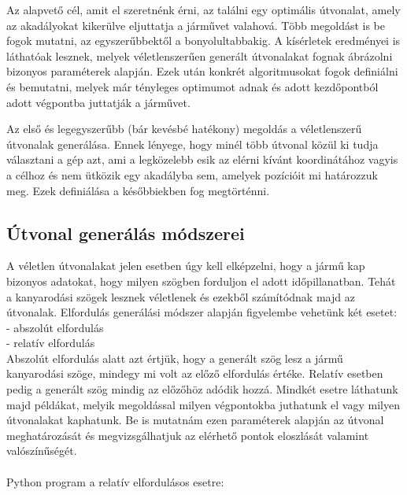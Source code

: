 

Az alapvető cél, amit el szeretnénk érni, az találni egy optimális útvonalat, amely az akadályokat kikerülve eljuttatja a járművet valahová. Több megoldást is be fogok mutatni, az egyszerűbbektől a bonyolultabbakig. A kísérletek eredményei is láthatóak lesznek, melyek véletlenszerűen generált útvonalakat fognak ábrázolni bizonyos paraméterek alapján. Ezek után konkrét algoritmusokat fogok definiálni és bemutatni, melyek már tényleges optimumot adnak és adott kezdőpontból adott végpontba juttatják a járművet. 



Az első és legegyszerűbb (bár kevésbé hatékony) megoldás a véletlenszerű útvonalak generálása. Ennek lényege, hogy minél több útvonal közül ki tudja választani a gép azt, ami a legközelebb esik az elérni kívánt koordinátához vagyis a célhoz és nem ütközik egy akadályba sem, amelyek pozícióit mi határozzuk meg. Ezek definiálása a későbbiekben fog megtörténni.\\ 

\subsection{Útvonal generálás módszerei}

A véletlen útvonalakat jelen esetben úgy kell elképzelni, hogy a jármű kap bizonyos adatokat, hogy milyen szögben forduljon el adott időpillanatban. Tehát a kanyarodási szögek lesznek véletlenek és ezekből számítódnak majd az útvonalak. Elfordulás generálási módszer alapján figyelembe vehetünk két esetet:\\
\phantom{len}- abszolút elfordulás\\ 
\phantom{len}- relatív elfordulás\\
Abszolút elfordulás alatt azt értjük, hogy a generált szög lesz a jármű kanyarodási szöge, mindegy mi volt az előző elfordulás értéke. Relatív esetben pedig a generált szög mindig az előzőhöz adódik hozzá. Mindkét esetre láthatunk majd példákat, melyik megoldással milyen végpontokba juthatunk el vagy milyen útvonalakat kaphatunk. Be is mutatnám ezen paraméterek alapján az útvonal meghatározását és megvizsgálhatjuk az elérhető pontok eloszlását valamint valószínűségét.\\\\
Python program a relatív elfordulásos esetre:

